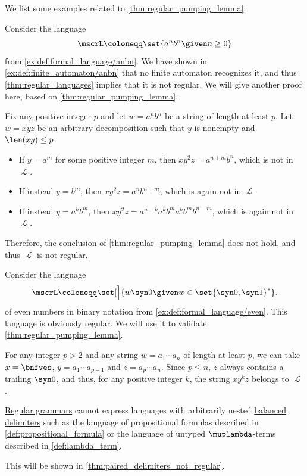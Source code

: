 \begin{example}\label{ex:thm:regular_pumping_lemma}
  We list some examples related to \cref{thm:regular_pumping_lemma}:
  \begin{thmenum}
     Consider the language
    \begin{equation*}
      \mscrL \coloneqq \set{ a^n b^n \given n \geq 0 }
    \end{equation*}
    from \cref{ex:def:formal_language/anbn}. We have shown in \cref{ex:def:finite_automaton/anbn} that no finite automaton recognizes it, and thus \cref{thm:regular_languages} implies that it is not regular. We will give another proof here, based on \cref{thm:regular_pumping_lemma}.

    Fix any positive integer \( p \) and let \( w = a^n b^n \) be a string of length at least \( p \). Let \( w = xyz \) be an arbitrary decomposition such that \( y \) is nonempty and \( \len(xy) \leq p \).

    \begin{itemize}
      \item If \( y = a^m \) for some positive integer \( m \), then \( x y^2 z = a^{n + m} b^n \), which is not in \( \mscrL \).
      \item If instead \( y = b^m \), then \( x y^2 z = a^n b^{n + m} \), which is again not in \( \mscrL \).
      \item If instead \( y = a^k b^m \), then \( x y^2 z = a^{n-k} a^k b^m a^k b^m b^{n - m} \), which is again not in \( \mscrL \).
    \end{itemize}

    Therefore, the conclusion of \cref{thm:regular_pumping_lemma} does not hold, and thus \( \mscrL \) is not regular.

     Consider the language
    \begin{equation*}
      \mscrL \coloneqq \set[\Big]{ w \syn0 \given w \in \set{ \syn0, \syn1 }^* }.
    \end{equation*}
    of even numbers in binary notation from \cref{ex:def:formal_language/even}. This language is obviously regular. We will use it to validate \cref{thm:regular_pumping_lemma}.

    For any integer \( p > 2 \) and any string \( w = a_1 \cdots a_n \) of length at least \( p \), we can take \( x = \bnfves \), \( y = a_1 \cdots a_{p-1} \) and \( z = a_p \cdots a_n \). Since \( p \leq n \), \( z \) always contains a trailing \( \syn0 \), and thus, for any positive integer \( k \), the string \( xy^kz \) belongs to \( \mscrL \).

     \hyperref[def:chomsky_hierarchy/regular]{Regular grammars} cannot express languages with arbitrarily nested \hyperref[def:paired_delimiters]{balanced delimiters} such as the language of propositional formulas described in \cref{def:propositional_formula} or the language of untyped \( \muplambda \)-terms described in \cref{def:lambda_term}.

    This will be shown in \cref{thm:paired_delimiters_not_regular}.
  \end{thmenum}
\end{example}
